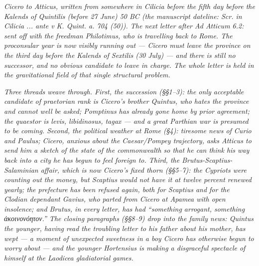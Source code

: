 
\textit{Cicero to Atticus, written from somewhere in
Cilicia before the fifth day before the Kalends of
Quintilis (before 27 June) 50 BC (the manuscript
dateline: \textit{Scr. in Cilicia ... ante v K. Quint.
a. 704 (50)}). The next letter after \textit{Ad
Atticum} 6.2: sent off with the freedman Philotimus,
who is travelling back to Rome. The proconsular year
is now visibly running out --- Cicero must leave the
province on the third day before the Kalends of
Sextilis (30 July) --- and there is still no
successor, and no obvious candidate to leave in
charge. The whole letter is held in the gravitational
field of that single structural problem.}

\textit{Three threads weave through. First, the
succession (\S\S 1--3): the only acceptable candidate
of praetorian rank is Cicero's brother Quintus, who
hates the province and cannot well be asked; Pomptinus
has already gone home by prior agreement; the quaestor
is \textit{levis, libidinosus, tagax} --- and a great
Parthian war is presumed to be coming. Second, the
political weather at Rome (\S 4): tiresome news of
Curio and Paulus; Cicero, anxious about the
Caesar/Pompey trajectory, asks Atticus to send him a
sketch of the state of the commonwealth so that he can
think his way back into a city he has begun to feel
foreign to. Third, the Brutus-Scaptius-Salaminian
affair, which is now Cicero's fixed thorn (\S\S 5--7):
the Cypriots were counting out the money, but Scaptius
would not have it at twelve percent renewed yearly;
the prefecture has been refused again, both for
Scaptius and for the Clodian dependant Gavius, who
parted from Cicero at Apamea with open insolence; and
Brutus, in every letter, has had ``something
arrogant, something \textit{ἀκοινονόητον}.'' The
closing paragraphs (\S\S 8--9) drop into the family
news: Quintus the younger, having read the troubling
letter to his father about his mother, has wept --- a
moment of unexpected sweetness in a boy Cicero has
otherwise begun to worry about --- and the younger
Hortensius is making a disgraceful spectacle of himself
at the Laodicea gladiatorial games.}
